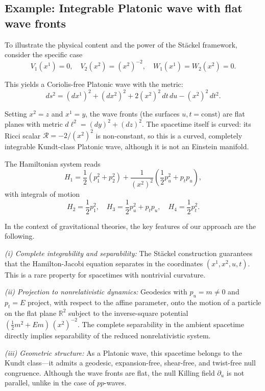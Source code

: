 \documentclass[10pt]{amsart}
\numberwithin{equation}{section}
\theoremstyle{definition}
\begin{document}
\subsection{Example: Integrable Platonic wave with flat wave fronts}
To illustrate the physical content and the power of the Stäckel framework, consider the specific case
\begin{equation}
	V_1(x^1) = 0, \quad V_2(x^2) = (x^2)^{-2}, \quad W_1(x^1) = W_2(x^2) = 0.
\end{equation}

This yields a Coriolis-free Platonic wave with the metric:
\begin{equation}
	ds^2 = (dx^1)^2 + (dx^2)^2 + 2(x^2)^2\,dt\,du - (x^2)^2\,dt^2.
\end{equation}

Setting $x^2 = z$ and $x^1 = y$, the wave fronts (the surfaces $u,t=\text{const}$) are flat planes with metric $d\ell^2 = (dy)^2 + (dz)^2$. The spacetime itself is curved: its Ricci scalar $\mathcal{R} = -2/(x^2)^2$ is non-constant, so this is a curved, completely integrable Kundt-class Platonic wave, although it is not an Einstein manifold.

The Hamiltonian system reads
\begin{equation}
	H_1 = \frac{1}{2}(p_1^2 + p_2^2) + \frac{1}{(x^2)^2}\left(\frac{1}{2}p_u^2 + p_t p_u\right),
\end{equation}
with integrals of motion
\begin{equation}
	H_2 = \frac{1}{2}p_1^2, \quad H_3 = \frac{1}{2}p_u^2 + p_t p_u, \quad H_4 = \frac{1}{2}p_t^2.
\end{equation}

In the context of gravitational theories, the key features of our approach are the following. 

\textit{(i) Complete integrability and separability:} The Stäckel construction guarantees that the Hamilton-Jacobi equation separates in the coordinates $(x^1, x^2, u, t)$. This is a rare property for spacetimes with nontrivial curvature.

\textit{(ii) Projection to nonrelativistic dynamics:} Geodesics with $p_u = m \neq 0$ and $p_t = E$ project, with respect to the affine parameter, onto the motion of a particle on the flat plane $\mathbb{R}^2$ subject to the inverse-square potential $(\tfrac12 m^2 + Em)\,(x^2)^{-2}$. The complete separability in the ambient spacetime directly implies separability of the reduced nonrelativistic system.

\textit{(iii) Geometric structure:} As a Platonic wave, this spacetime belongs to the Kundt class—it admits a geodesic, expansion-free, shear-free, and twist-free null congruence. Although the wave fronts are flat, the null Killing field $\partial_u$ is not parallel, unlike in the case of $pp$-waves.
\end{document}
